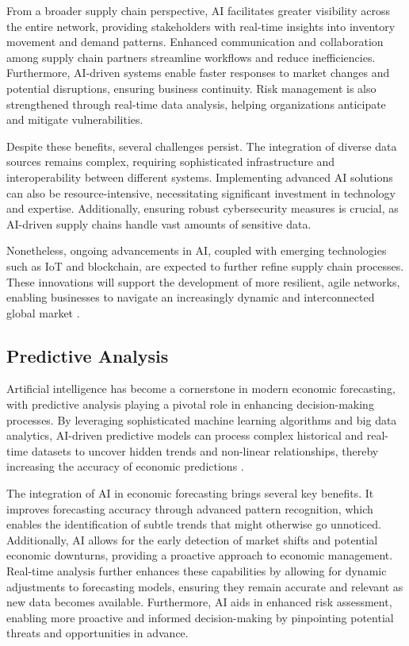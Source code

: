 From a broader supply chain perspective, AI facilitates greater visibility across the entire network, providing stakeholders with real-time insights into inventory movement and demand patterns. Enhanced communication and collaboration among supply chain partners streamline workflows and reduce inefficiencies. Furthermore, AI-driven systems enable faster responses to market changes and potential disruptions, ensuring business continuity. Risk management is also strengthened through real-time data analysis, helping organizations anticipate and mitigate vulnerabilities.

Despite these benefits, several challenges persist. The integration of diverse data sources remains complex, requiring sophisticated infrastructure and interoperability between different systems. Implementing advanced AI solutions can also be resource-intensive, necessitating significant investment in technology and expertise. Additionally, ensuring robust cybersecurity measures is crucial, as AI-driven supply chains handle vast amounts of sensitive data.

Nonetheless, ongoing advancements in AI, coupled with emerging technologies such as IoT and blockchain, are expected to further refine supply chain processes. These innovations will support the development of more resilient, agile networks, enabling businesses to navigate an increasingly dynamic and interconnected global market \cite{IBM-AI-Supply-Chain}.


\subsection{Predictive Analysis}
\label{subsec:predictive-analysis}

Artificial intelligence has become a cornerstone in modern economic forecasting, with predictive analysis playing a pivotal role in enhancing decision-making processes. 
By leveraging sophisticated machine learning algorithms and big data analytics, AI-driven predictive models can process complex historical and real-time datasets to 
uncover hidden trends and non-linear relationships, thereby increasing the accuracy of economic predictions \cite{Predictive-Analysis-ai}. 

The integration of AI in economic forecasting brings several key benefits. It improves forecasting accuracy through advanced pattern recognition, 
which enables the identification of subtle trends that might otherwise go unnoticed. Additionally, AI allows for the early detection of market shifts 
and potential economic downturns, providing a proactive approach to economic management. Real-time analysis further enhances these capabilities by 
allowing for dynamic adjustments to forecasting models, ensuring they remain accurate and relevant as new data becomes available. Furthermore, 
AI aids in enhanced risk assessment, enabling more proactive and informed decision-making by pinpointing potential threats and opportunities in advance.

